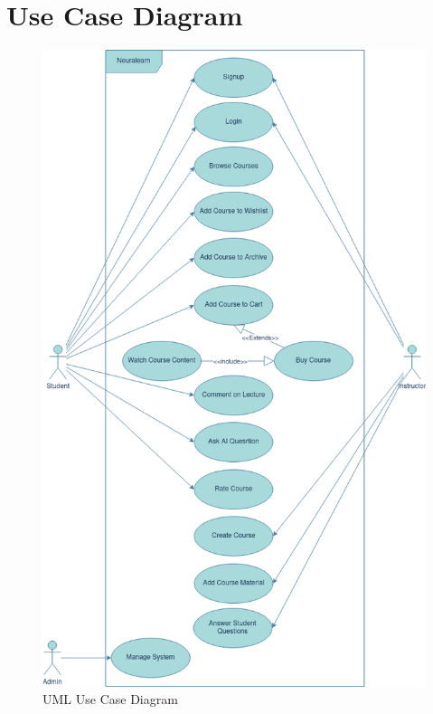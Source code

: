 \section{Use Case Diagram}
\begin{figure}[h!]
	\centering
	\includegraphics[scale=0.5]{figures/UML-Use-Case.png}
	\caption{UML Use Case Diagram}
\end{figure}

\newpage

